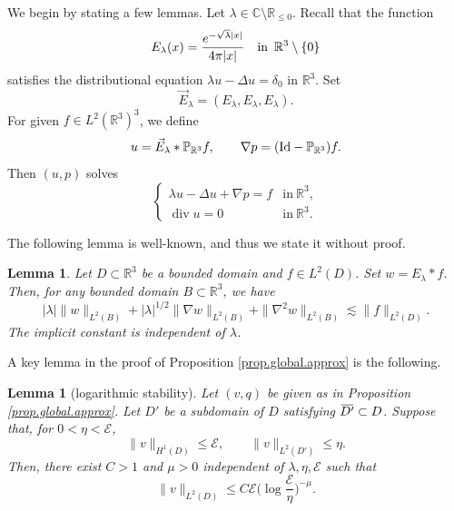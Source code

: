 \documentclass[11pt,a4paper]{article}
\numberwithin{equation}{section}
\newtheorem{lemma}[theorem]{Lemma}
\newcommand{\R}{\mathbb{R}}
\newcommand{\C}{\mathbb{C}}
\newcommand{\opdiv}{\operatorname{div}}
\newcommand{\overbar}[1]{\mkern 1.5mu\overline{\mkern-1.5mu#1\mkern-1.5mu}\mkern 1.5mu}
\begin{document}
We begin by stating a few lemmas. Let $\lambda\in \C\setminus\R_{\le0}$. Recall that the function
\[
    E_\lambda(x) = \frac{e^{-\sqrt{\lambda}|x|}}{4\pi|x|} 
    \quad \text{in} \mkern9mu \R^3 \setminus\{0\} 
\]
satisfies the distributional equation $\lambda u - \Delta u = \delta_0$ in $\R^3$. Set 
\[
    \vec{E}_\lambda = (E_\lambda,E_\lambda,E_\lambda). 
\]
For given $f\in L^2(\R^3)^3$, we define 
\[
    u = \vec{E}_\lambda \ast {\mathbb P}_{\R^3} f, 
    \qquad
    \nabla p = ({\rm Id} - {\mathbb P}_{\R^3}) f. 
\]
Then $(u,p)$ solves 
\[
    \left\{
    \begin{array}{ll}
    \lambda u - \Delta u + \nabla p
    = f&\mbox{in}\ \R^3, \\
    \opdiv u
    = 0&\mbox{in}\ \R^3.
    \end{array}\right.
\]


The following lemma is well-known, and thus we state it without proof.  


\begin{lemma}\label{lem.est.R3}
Let $D\subset \R^3$ be a bounded domain and $f\in L^2(D)$. Set $w = E_\lambda \ast f$. Then, for any bounded domain $B \subset \R^3$, we have 
\[
    |\lambda| \|w\|_{L^2(B)}
    + |\lambda|^{1/2} \|\nabla w\|_{L^2(B)}
    +  \|\nabla^2 w\|_{L^2(B)}
    \lesssim 
    \|f\|_{L^2(D)}.
\]
The implicit constant is independent of $\lambda$.
\end{lemma}


A key lemma in the proof of Proposition \ref{prop.global.approx} is the following. 


\begin{lemma}[logarithmic stability]\label{lem.est.stab}
Let $(v, q)$ be given as in Proposition \ref{prop.global.approx}. Let $D'$ be a subdomain of $D$ satisfying $\overbar{D'} \subset D$. Suppose that, for $0<\eta<\mathcal{E}$, 
\[
    \|v\|_{H^1(D)} \le \mathcal{E}, 
    \qquad
    \|v\|_{L^2(D')} \le \eta. 
\]
Then, there exist $C>1$ and $\mu>0$ independent of $\lambda, \eta, \mathcal{E}$ such that 
\begin{equation}\label{est.stab}
    \|v\|_{L^2(D)}
    \le 
    C \mathcal{E} 
    \bigg(\log \frac{\mathcal{E}}{\eta} \bigg)^{-\mu}. 
\end{equation}
\end{lemma}
\end{document}
